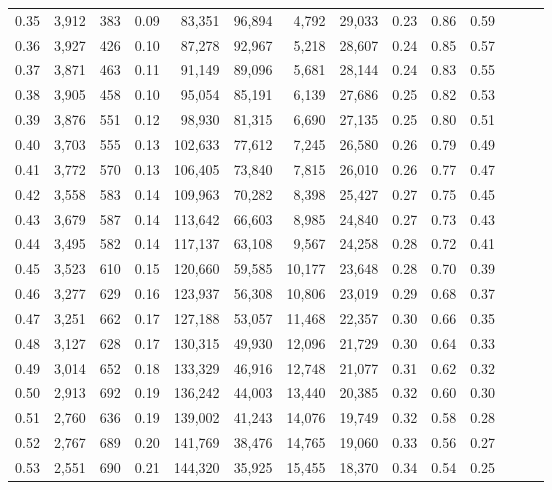 \begin{tabular}{rrrrrrrrrrrrrr}
0.35 &  3,912 &  383 &  0.09 &   83,351 &   96,894 &   4,792 &  29,033 &  0.23 &  0.86 &      0.59 \\
0.36 &  3,927 &  426 &  0.10 &   87,278 &   92,967 &   5,218 &  28,607 &  0.24 &  0.85 &      0.57 \\
0.37 &  3,871 &  463 &  0.11 &   91,149 &   89,096 &   5,681 &  28,144 &  0.24 &  0.83 &      0.55 \\
0.38 &  3,905 &  458 &  0.10 &   95,054 &   85,191 &   6,139 &  27,686 &  0.25 &  0.82 &      0.53 \\
0.39 &  3,876 &  551 &  0.12 &   98,930 &   81,315 &   6,690 &  27,135 &  0.25 &  0.80 &      0.51 \\
0.40 &  3,703 &  555 &  0.13 &  102,633 &   77,612 &   7,245 &  26,580 &  0.26 &  0.79 &      0.49 \\
0.41 &  3,772 &  570 &  0.13 &  106,405 &   73,840 &   7,815 &  26,010 &  0.26 &  0.77 &      0.47 \\
0.42 &  3,558 &  583 &  0.14 &  109,963 &   70,282 &   8,398 &  25,427 &  0.27 &  0.75 &      0.45 \\
0.43 &  3,679 &  587 &  0.14 &  113,642 &   66,603 &   8,985 &  24,840 &  0.27 &  0.73 &      0.43 \\
0.44 &  3,495 &  582 &  0.14 &  117,137 &   63,108 &   9,567 &  24,258 &  0.28 &  0.72 &      0.41 \\
0.45 &  3,523 &  610 &  0.15 &  120,660 &   59,585 &  10,177 &  23,648 &  0.28 &  0.70 &      0.39 \\
0.46 &  3,277 &  629 &  0.16 &  123,937 &   56,308 &  10,806 &  23,019 &  0.29 &  0.68 &      0.37 \\
0.47 &  3,251 &  662 &  0.17 &  127,188 &   53,057 &  11,468 &  22,357 &  0.30 &  0.66 &      0.35 \\
0.48 &  3,127 &  628 &  0.17 &  130,315 &   49,930 &  12,096 &  21,729 &  0.30 &  0.64 &      0.33 \\
0.49 &  3,014 &  652 &  0.18 &  133,329 &   46,916 &  12,748 &  21,077 &  0.31 &  0.62 &      0.32 \\
0.50 &  2,913 &  692 &  0.19 &  136,242 &   44,003 &  13,440 &  20,385 &  0.32 &  0.60 &      0.30 \\
0.51 &  2,760 &  636 &  0.19 &  139,002 &   41,243 &  14,076 &  19,749 &  0.32 &  0.58 &      0.28 \\
0.52 &  2,767 &  689 &  0.20 &  141,769 &   38,476 &  14,765 &  19,060 &  0.33 &  0.56 &      0.27 \\
0.53 &  2,551 &  690 &  0.21 &  144,320 &   35,925 &  15,455 &  18,370 &  0.34 &  0.54 &      0.25 \\

\end{tabular}
